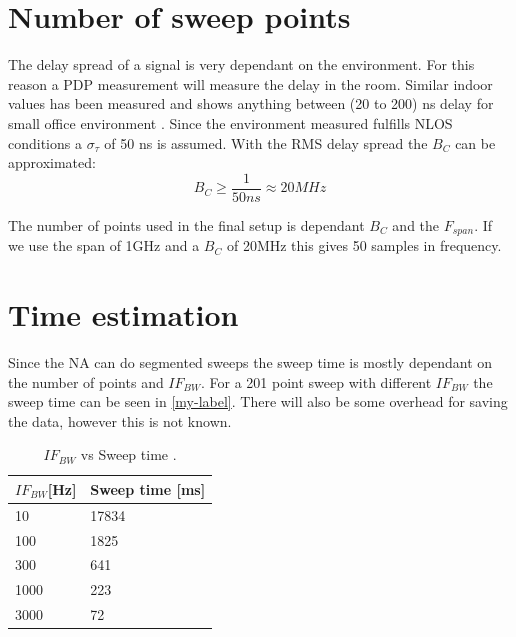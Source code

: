 \section{Number of sweep points}
The delay spread of a signal is very dependant on the environment. For this reason a PDP measurement will measure the delay in the room. Similar indoor values has been measured and shows anything between (20 to 200) ns delay for small office environment \citep{indoor_delay}. Since the environment measured fulfills NLOS conditions a $\sigma_{\tau}$ of 50 ns is assumed. With the RMS delay spread the $B_C$ can be approximated: 
\begin{equation}
B_C \geq \frac{1}{50ns} \approx 20MHz
\label{CohBW1}
\end{equation}

The number of points used in the final setup is dependant $B_C$ and the $F_{span}$. If we use the span of 1GHz and a $B_C$ of 20MHz this gives 50 samples in frequency.

\section{Time estimation}
\label{TIME_EST}
Since the \gls{NA} can do segmented sweeps the sweep time is mostly dependant on the number of points and $IF_{BW}$.
For a 201 point sweep with different $IF_{BW}$ the sweep time can be seen in \autoref{my-label}. There will also be some overhead for saving the data, however this is not known.\\

\begin{table}[H]
\centering
\begin{tabular}{|l|l|}
\hline
$IF_{BW}${[}Hz{]} & Sweep time {[}ms{]} \\
\hline
10              & 17834               \\
100             & 1825                \\
300             & 641                 \\
1000            & 223                 \\
3000            & 72            \\
\hline 
\end{tabular}
\caption{$IF_{BW}$ vs Sweep time \citep{Key_PNA}.}
\label{my-label}
\end{table}





